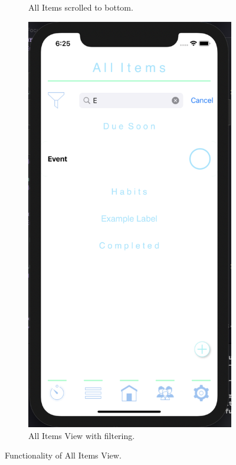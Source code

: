 \begin{figure}[H]
\begin{subfigure}[b]{0.3\textwidth}
        \caption{All Items scrolled to bottom.}
        \label{fig:all_items2_app}
    \end{subfigure}
    \hfill
    \begin{subfigure}[b]{0.3\textwidth}
        \centering
        \includegraphics[width=\textwidth]{./graphics/Implementation/All Items/all items3.png}
        \caption{All Items View with filtering.}
        \label{fig:all_items3_app}
    \end{subfigure}
    
    \caption{Functionality of All Items View.}
    \label{fig:all_items_app}
\end{figure}